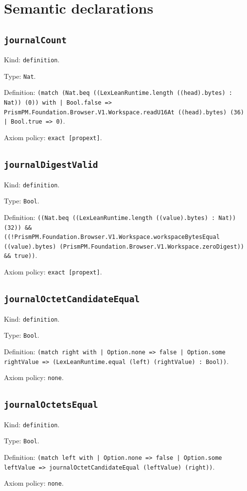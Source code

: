 \documentclass[11pt]{article}
\begin{document}
\section*{Semantic declarations}
\subsection*{\texttt{journalCount}}
\noindent Kind: \texttt{definition}.\par
\noindent Type: \texttt{Nat}.\par
\noindent Definition: \texttt{(match (Nat.beq ((LexLeanRuntime.length ((head).bytes) : Nat)) (0)) with | Bool.false => PrismPM.Foundation.Browser.V1.Workspace.readU16At ((head).bytes) (36) | Bool.true => 0)}.\par
\noindent Axiom policy: \texttt{exact [propext]}.\par
\subsection*{\texttt{journalDigestValid}}
\noindent Kind: \texttt{definition}.\par
\noindent Type: \texttt{Bool}.\par
\noindent Definition: \texttt{((Nat.beq ((LexLeanRuntime.length ((value).bytes) : Nat)) (32)) \&\& ((!PrismPM.Foundation.Browser.V1.Workspace.workspaceBytesEqual ((value).bytes) (PrismPM.Foundation.Browser.V1.Workspace.zeroDigest)) \&\& true))}.\par
\noindent Axiom policy: \texttt{exact [propext]}.\par
\subsection*{\texttt{journalOctetCandidateEqual}}
\noindent Kind: \texttt{definition}.\par
\noindent Type: \texttt{Bool}.\par
\noindent Definition: \texttt{(match right with | Option.none => false | Option.some rightValue => (LexLeanRuntime.equal (left) (rightValue) : Bool))}.\par
\noindent Axiom policy: \texttt{none}.\par
\subsection*{\texttt{journalOctetsEqual}}
\noindent Kind: \texttt{definition}.\par
\noindent Type: \texttt{Bool}.\par
\noindent Definition: \texttt{(match left with | Option.none => false | Option.some leftValue => journalOctetCandidateEqual (leftValue) (right))}.\par
\noindent Axiom policy: \texttt{none}.\par
\end{document}
